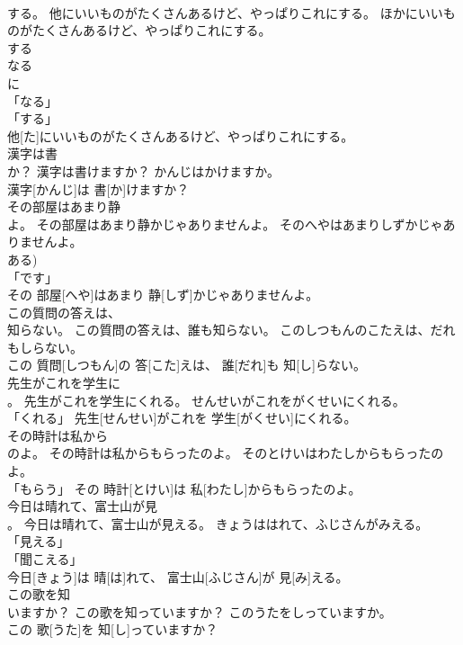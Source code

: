 \documentclass[8pt]{extreport}
\begin{document}
\begin{CJK}{UTF8}{min}
\\	する。	他にいいものがたくさんあるけど、やっぱりこれにする。	ほかにいいものがたくさんあるけど、やっぱりこれにする。	
\\	する 
\\	なる 
\\	に 
\\	「なる」 
\\	「する」 
\\	他[た]にいいものがたくさんあるけど、やっぱりこれにする。		
\\	漢字は書
\\	か？	漢字は書けますか？	かんじはかけますか。	
\\	漢字[かんじ]は 書[か]けますか？		
\\	その部屋はあまり静
\\	よ。	その部屋はあまり静かじゃありませんよ。	そのへやはあまりしずかじゃありませんよ。	
\\	ある)	
\\	「です」 
\\	その 部屋[へや]はあまり 静[しず]かじゃありませんよ。		
\\	この質問の答えは、
\\	知らない。	この質問の答えは、誰も知らない。	このしつもんのこたえは、だれもしらない。	
\\	この 質問[しつもん]の 答[こた]えは、 誰[だれ]も 知[し]らない。		
\\	先生がこれを学生に
\\	。	先生がこれを学生にくれる。	せんせいがこれをがくせいにくれる。	
\\	「くれる」	先生[せんせい]がこれを 学生[がくせい]にくれる。		
\\	その時計は私から
\\	のよ。	その時計は私からもらったのよ。	そのとけいはわたしからもらったのよ。	
\\	「もらう」	その 時計[とけい]は 私[わたし]からもらったのよ。		
\\	今日は晴れて、富士山が見
\\	。	今日は晴れて、富士山が見える。	きょうははれて、ふじさんがみえる。	
\\	「見える」 
\\	「聞こえる」 
\\	今日[きょう]は 晴[は]れて、 富士山[ふじさん]が 見[み]える。		
\\	この歌を知
\\	いますか？	この歌を知っていますか？	このうたをしっていますか。	
\\	この 歌[うた]を 知[し]っていますか？		

\end{CJK}
\end{document}
